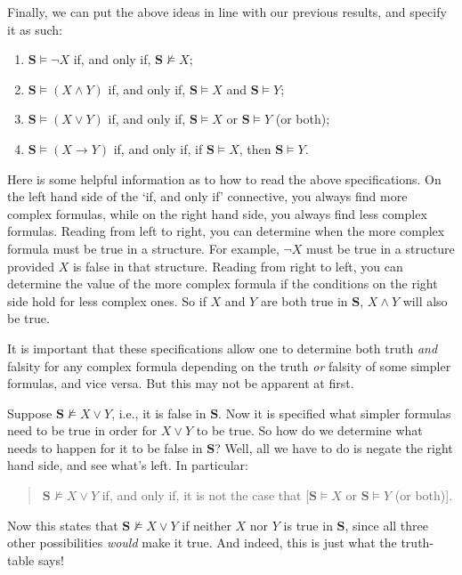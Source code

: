 Finally, we can put the above ideas in line with our previous results, and specify it as such:

\begin{enumerate}
	\item $\mathbf{S} \models \neg X$ if, and only if, $\mathbf{S} \not\models X$;
	\item $\mathbf{S} \models (X \wedge Y)$ if, and only if, $\mathbf{S} \models X$ and $\mathbf{S}\models Y$;
	\item $\mathbf{S} \models (X \vee Y)$ if, and only if, $\mathbf{S} \models X$ or $\mathbf{S}\models Y$ (or both);
	\item $\mathbf{S} \models (X \rightarrow Y)$ if, and only if, if $\mathbf{S} \models X$, then $\mathbf{S} \models Y$. 
\end{enumerate}

Here is some helpful information as to how to read the above specifications. On the left hand side of the `if, and only if' connective, you always find more complex formulas, while on the right hand side, you always find less complex formulas. Reading from left to right, you can determine when the more complex formula must be true in a structure. For example, $\neg X$ must be true in a structure provided $X$ is false in that structure. Reading from right to left, you can determine the value of the more complex formula if the conditions on the right side hold for less complex ones. So if $X$ and $Y$ are both true in $\mathbf{S}$, $X \wedge Y$ will also be true. 

It is important that these specifications allow one to determine both truth \textit{and} falsity for any complex formula depending on the truth \textit{or} falsity of some simpler formulas, and vice versa. But this may not be apparent at first. 

Suppose $\mathbf{S} \not\models X \vee Y$, i.e., it is false in $\mathbf{S}$. Now it is specified what simpler formulas need to be true in order for $X \vee Y$ to be true. So how do we determine what needs to happen for it to be false in $\mathbf{S}$? Well, all we have to do is negate the right hand side, and see what's left. In particular:
%
\begin{quote}
	$\mathbf{S} \not\models X \vee Y$ if, and only if, it is not the case that [$\mathbf{S} \models X$ or $\mathbf{S}\models Y$ (or both)].
\end{quote}
%
Now this states that $\mathbf{S} \not\models X \vee Y$ if neither $X$ nor $Y$ is true in $\mathbf{S}$, since all three other possibilities \textit{would} make it true. And indeed, this is just what the truth-table says!

